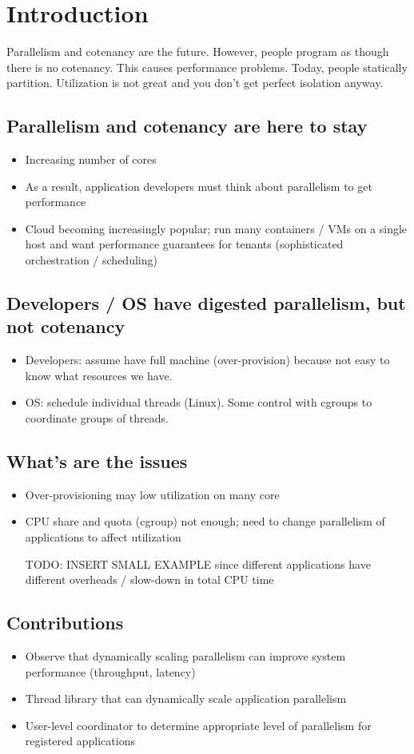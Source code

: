 \section{Introduction}
Parallelism and cotenancy are the future. However, people program as though there is no cotenancy. This causes performance problems. Today, people statically partition. Utilization is not great and you don't get perfect isolation anyway.
\subsection*{Parallelism and cotenancy are here to stay}
\begin{itemize}
  \item Increasing number of cores \cite{baumann2009multikernel}
  \item As a result, application developers must think about parallelism to get performance
  \item Cloud becoming increasingly popular; run many containers / VMs on a single host and want performance guarantees for tenants (sophisticated orchestration / scheduling)
\end{itemize}
\subsection*{Developers / OS have digested parallelism, but not cotenancy}
\begin{itemize}
  \item Developers: assume have full machine (over-provision) because not easy to know what resources we have.
  \item OS: schedule individual threads (Linux). Some control with cgroups to coordinate groups of threads.
\end{itemize}
\subsection*{What's are the issues}
\begin{itemize}
  \item Over-provisioning may low utilization on many core
  \item CPU share and quota (cgroup) not enough; need to change parallelism of applications to affect utilization
  \item [TODO: INSERT SMALL EXAMPLE] since different applications have different overheads / slow-down in total CPU time
\end{itemize}
\subsection*{Contributions}
\begin{itemize}
  \item Observe that dynamically scaling parallelism can improve system performance (throughput, latency)
  \item Thread library that can dynamically scale application parallelism
  \item User-level coordinator to determine appropriate level of parallelism for registered applications
\end{itemize}
